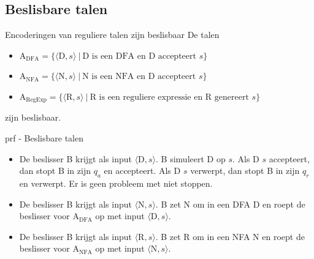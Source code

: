 \newpage

\subsection{Beslisbare talen}

\vspace{0.3cm}

\begin{lem}{Encoderingen van reguliere talen zijn beslisbaar}
    \vspace{-0.1cm}
    De talen
    \begin{itemize}
        \item 
            A$_{\text{DFA}} = \{\langle \text{D}, s\rangle\  | \ \text{D is een DFA en D accepteert $s$} \}$
        \item 
            A$_{\text{NFA}} = \{\langle \text{N}, s\rangle\  | \ \text{N is een NFA en D accepteert $s$} \}$
        \item 
            A$_{\text{RegExp}} = \{\langle \text{R}, s\rangle\  | \ \text{R is een reguliere expressie en R genereert $s$} \}$
    \end{itemize}
    zijn beslisbaar.
    \vspace{-0.1cm}
\end{lem}

\begin{prf}{prf - Beslisbare talen}
    \vspace{-0.1cm}
    \begin{itemize}
        \item 
            De beslisser B krijgt als input $\langle \text{D}, s\rangle$. B simuleert D op $s$. Als D $s$ accepteert, dan stopt B in zijn $q_a$ en accepteert. Als D $s$ verwerpt, dan stopt B in zijn $q_r$ en verwerpt. Er is geen probleem met niet stoppen.
        \item 
            De beslisser B krijgt als input $\langle \text{N}, s\rangle$. B zet N om in een DFA D en roept de beslisser voor A$_{\text{DFA}}$ op met input $\langle \text{D}, s\rangle$.
        \item 
            De beslisser B krijgt als input $\langle \text{R}, s\rangle$. B zet R om in een NFA N en roept de beslisser voor A$_{\text{NFA}}$ op met input $\langle \text{N}, s\rangle$.
    \end{itemize}
    \vspace{-0.3cm}
\end{prf}

